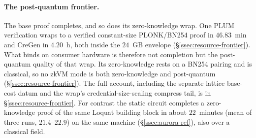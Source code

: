 \paragraph{The post-quantum frontier.}
The base proof completes, and so does its zero-knowledge wrap. One PLUM verification wraps to a verified constant-size {PLONK}/{BN254} proof in $46.83$~min and CreGen in $4.20$~h, both inside the $24$~GB envelope (\S\ref{ssec:resource-frontier}). What binds on consumer hardware is therefore not completion but the post-quantum quality of that wrap. Its zero-knowledge rests on a {BN254} pairing and is classical, so no zkVM mode is both zero-knowledge and post-quantum (\S\ref{ssec:resource-frontier}). The full account, including the separate lattice base-cost datum and the wrap's credential-size-scaling compress tail, is in \S\ref{ssec:resource-frontier}. For contrast the static circuit completes a zero-knowledge proof of the same Loquat building block in about $22$~minutes (mean of three runs, $21.4$--$22.9$) on the same machine (\S\ref{ssec:aurora-ref}), also over a classical field.

